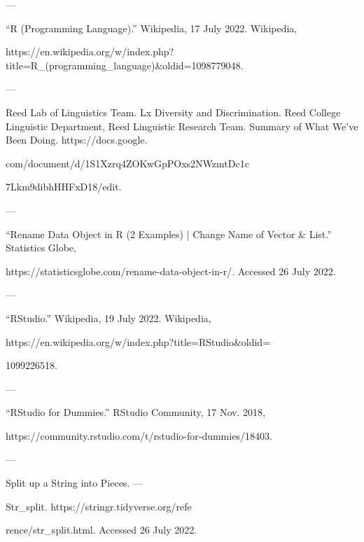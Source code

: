 \documentclass{scrartcl}
\begin{document}
---

“R (Programming Language).” Wikipedia, 17 July 2022. Wikipedia, \par https://en.wikipedia.org/w/index.php?title=R_(programming_language)&oldid=1098779048. \par

---

Reed Lab of Linguistics Team. Lx Diversity and Discrimination. Reed College Linguistic Department, Reed Linguistic Research Team. Summary of What We’ve Been Doing. https://docs.google. \par
com/document/d/1S1Xzrq4ZOKwGpPOxs2NWzmtDc1c \par
7Lkm9dibhHHFxD18/edit.\par

---

“Rename Data Object in R (2 Examples) | Change Name of Vector & List.” Statistics Globe, \par https://statisticsglobe.com/rename-data-object-in-r/. Accessed 26 July 2022. \par

---

“RStudio.” Wikipedia, 19 July 2022. Wikipedia, \par
https://en.wikipedia.org/w/index.php?title=RStudio&oldid=\par
1099226518.\par

---

“RStudio for Dummies.” RStudio Community, 17 Nov. 2018, \par
https://community.rstudio.com/t/rstudio-for-dummies/18403.\par 

---

Split up a String into Pieces. — \par 
Str_split. https://stringr.tidyverse.org/refe \par
rence/str_split.html. Accessed 26 July 2022.\par
\end{document}
